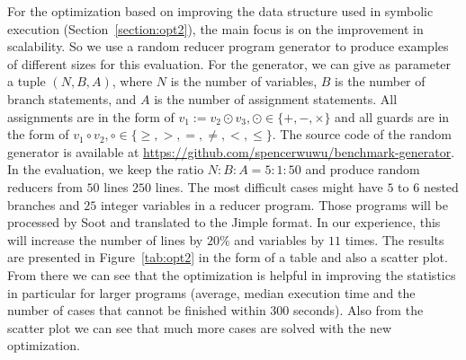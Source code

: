 \documentclass{llncs}
\begin{document}
For the optimization based on improving the data structure used in symbolic execution (Section~\ref{section:opt2}), the main focus is on the improvement in scalability. So we use a random reducer program generator to produce examples of different sizes for this evaluation.
For the generator, we can give as parameter a tuple $(N,B,A)$, where $N$ is the number of variables, $B$ is the number of branch statements, and $A$ is the number of assignment statements. All assignments are in the form of $v_1 := v_2\odot v_3,\odot\in\{+,-,\times\}$ and all guards are in the form of $v_1 \circ v_2, \circ\in\{\geq, >,=, \neq, <,\leq \}$.
The source code of the random generator is available at \url{https://github.com/spencerwuwu/benchmark-generator}.
In the evaluation, we keep the ratio $N:B:A = 5:1:50$ and produce random reducers from $50$ lines $250$ lines. The most difficult cases might have $5$ to $6$ nested branches and $25$ integer variables in a reducer program. Those programs will be processed by Soot and translated to the Jimple format. In our experience, this will increase the number of lines by $20\%$ and variables by $11$ times. The results are presented in Figure~\ref{tab:opt2} in the form of a table and also a scatter plot. From there we can see that the optimization is helpful in improving the statistics in particular for larger programs (average, median execution time and the number of cases that cannot be finished within 300 seconds). Also from the scatter plot we can see that much more cases are solved with the new optimization.
\end{document}
